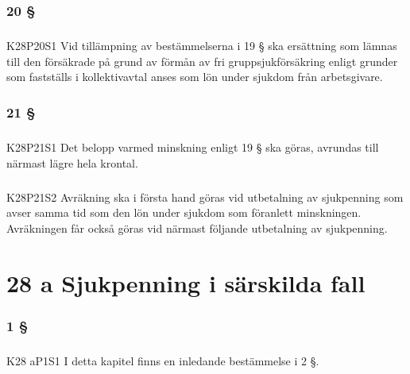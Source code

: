 \documentclass[a4paper,notitlepage,openany,10pt]{book}
\begin{document}
\subsection*{20 §}
\paragraph*{}
{\tiny K28P20S1}
Vid tillämpning av bestämmelserna i 19 § ska ersättning som lämnas till den försäkrade på grund av förmån av fri gruppsjukförsäkring enligt grunder som fastställs i kollektivavtal anses som lön under sjukdom från arbetsgivare.
\subsection*{21 §}
\paragraph*{}
{\tiny K28P21S1}
Det belopp varmed minskning enligt 19 § ska göras, avrundas till närmast lägre hela krontal.
\paragraph*{}
{\tiny K28P21S2}
Avräkning ska i första hand göras vid utbetalning av sjukpenning som avser samma tid som den lön under sjukdom som föranlett minskningen. Avräkningen får också göras vid närmast följande utbetalning av sjukpenning.
\chapter*{28 a Sjukpenning i särskilda fall}
\subsection*{1 §}
\paragraph*{}
{\tiny K28 aP1S1}
I detta kapitel finns en inledande bestämmelse i 2 §.
\end{document}
